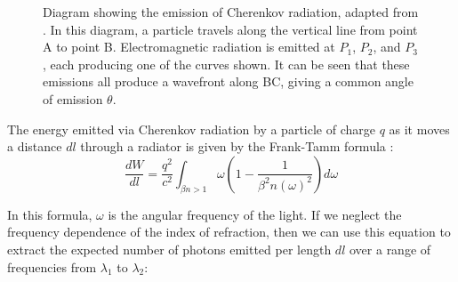 \begin{figure}[]
\centering
{}
\caption[Diagram showing the emission of Cherenkov radiation]{Diagram showing the emission of Cherenkov radiation, adapted from \cite{cherenkov}.
In this diagram, a particle travels along the vertical line from point A to point B.
Electromagnetic radiation is emitted at $P_1$, $P_2$, and $P_3$, each producing one of the curves shown.
It can be seen that these emissions all produce a wavefront along BC, giving a common angle of emission $\theta$.}
\label{fig:cherenkov} 
\end{figure}

The energy emitted via Cherenkov radiation by a particle of charge $q$ as it moves a distance $dl$ through a radiator is given by the Frank-Tamm formula \cite{frankTamm}:
\begin{equation}
    \label{eq:frankTamm}
    \frac{dW}{dl} = \frac{q^2}{c^2}\int_{\beta n > 1} \omega  \left(1 - \frac{1}{\beta^2n(\omega)^2}\right)d\omega
\end{equation}

In this formula, $\omega$ is the angular frequency of the light.
If we neglect the frequency dependence of the index of refraction, then we can use this equation to extract the expected number of photons emitted per length $dl$ over a range of frequencies from $\lambda_1$ to $\lambda_2$:

